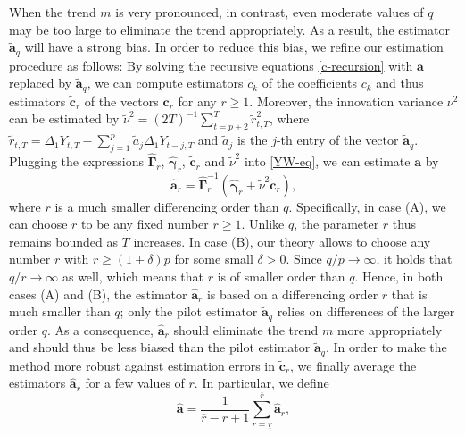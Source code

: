 When the trend $m$ is very pronounced, in contrast, even moderate values of $q$ may be too large to eliminate the trend appropriately. As a result, the estimator $\widetilde{\boldsymbol{a}}_q$ will have a strong bias. In order to reduce this bias, we refine our estimation procedure as follows: By solving the recursive equations \eqref{c-recursion} with $\boldsymbol{a}$ replaced by $\widetilde{\boldsymbol{a}}_q$, we can compute estimators $\widetilde{c}_k$ of the coefficients $c_k$ and thus estimators $\widetilde{\boldsymbol{c}}_r$ of the vectors $\boldsymbol{c}_r$ for any $r \ge 1$. Moreover, the innovation variance $\nu^2$ can be estimated by $\widetilde{\nu}^2 = (2T)^{-1} \sum_{t=p+2}^T \widetilde{r}_{t,T}^2$, where $\widetilde{r}_{t,T} = \Delta_1 Y_{t,T} - \sum_{j=1}^p \widetilde{a}_j \Delta_1 Y_{t-j,T}$ and $\widetilde{a}_j$ is the $j$-th entry of the vector $\widetilde{\boldsymbol{a}}_q$. Plugging the expressions $\widehat{\boldsymbol{\Gamma}}_r$, $\widehat{\boldsymbol{\gamma}}_r$, $\widetilde{\boldsymbol{c}}_r$ and $\widetilde{\nu}^2$ into \eqref{YW-eq}, we can estimate $\boldsymbol{a}$ by 
\begin{equation}\label{est-AR-SS} 
\widehat{\boldsymbol{a}}_r = \widehat{\boldsymbol{\Gamma}}_r^{-1} (\widehat{\boldsymbol{\gamma}}_r + \widetilde{\nu}^2 \widetilde{\boldsymbol{c}}_r),
\end{equation} 
where $r$ is a much smaller differencing order than $q$. Specifically, in case (A), we can choose $r$ to be any fixed number $r \ge 1$. Unlike $q$, the parameter $r$ thus remains bounded as $T$ increases. In case (B), our theory allows to choose any number $r$ with $r \ge (1+\delta) p$ for some small $\delta > 0$. Since $q/p \rightarrow \infty$, it holds that $q/r \rightarrow \infty$ as well, which means that $r$ is of smaller order than $q$. Hence, in both cases (A) and (B), the estimator $\widehat{\boldsymbol{a}}_r$ is based on a differencing order $r$ that is much smaller than $q$; only the pilot estimator $\widetilde{\boldsymbol{a}}_q$ relies on differences of the larger order $q$. As a consequence, $\widehat{\boldsymbol{a}}_r$ should eliminate the trend $m$ more appropriately and should thus be less biased than the pilot estimator $\widetilde{\boldsymbol{a}}_q$. In order to make the method more robust against estimation errors in $\widetilde{\boldsymbol{c}}_r$, we finally average the estimators $\widehat{\boldsymbol{a}}_r$ for a few values of $r$. In particular, we define  
\begin{equation}\label{est-AR}
\widehat{\boldsymbol{a}} = \frac{1}{\overline{r}-\underline{r}+1} \sum\limits_{r=\underline{r}}^{\overline{r}} \widehat{\boldsymbol{a}}_r, 
\end{equation}
